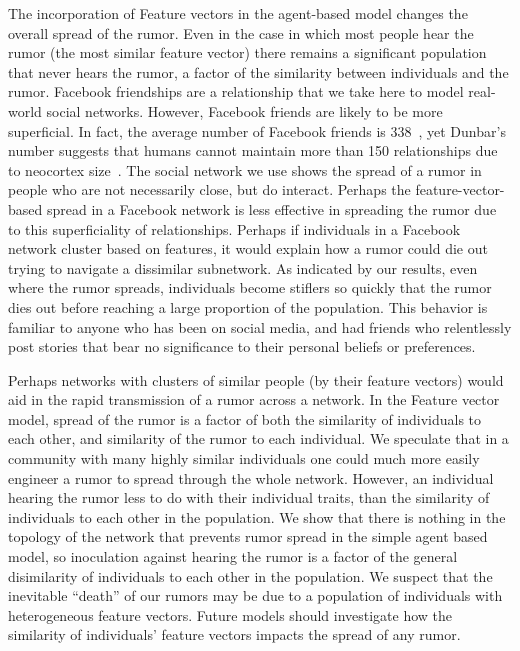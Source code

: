 The incorporation of Feature vectors in the agent-based model changes the overall spread of the rumor.
Even in the case in which most people hear the rumor (the most similar feature vector) there remains a significant population that never hears the rumor, a factor of the similarity between individuals and the rumor.
Facebook friendships are a relationship that we take here to model real-world social networks.
However, Facebook friends are likely to be more superficial.
In fact, the average number of Facebook friends is 338~\cite{smith-2014}, yet Dunbar's number suggests that humans cannot maintain more than 150 relationships due to neocortex size~\cite{dunbar-1992}.
The social network we use shows the spread of a rumor in people who are not necessarily close, but do interact.
Perhaps the feature-vector-based spread in a Facebook network is less effective in spreading the rumor due to this superficiality of relationships.
Perhaps if individuals in a Facebook network cluster based on features, it would explain how a rumor could die out trying to navigate a dissimilar subnetwork.
As indicated by our results, even where the rumor spreads, individuals become stiflers so quickly that the rumor dies out before reaching a large proportion of the population.
This behavior is familiar to anyone who has been on social media, and had friends who relentlessly post stories that bear no significance to their personal beliefs or preferences.


Perhaps networks with clusters of similar people (by their feature vectors) would aid in the rapid transmission of a rumor across a network.
In the Feature vector model, spread of the rumor is a factor of both the similarity of individuals to each other, and similarity of the rumor to each individual.
We speculate that in a community with many highly similar individuals one could much more easily engineer a rumor to spread through the whole network.
However, an individual hearing the rumor less to do with their individual traits, than the similarity of individuals to each other in the population.
We show that there is nothing in the topology of the network that prevents rumor spread in the simple agent based model, so inoculation against hearing the rumor is a factor of the general disimilarity of individuals to each other in the population.
We suspect that the inevitable ``death'' of our rumors may be due to a population of individuals with heterogeneous feature vectors.
Future models should investigate how the similarity of individuals' feature vectors impacts the spread of any rumor.


